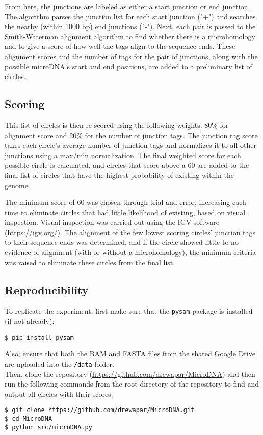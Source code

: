 \documentclass[11pt, letterpaper]{article}
\begin{document}
\noindent From here, the junctions are labeled as either a start junction or end junction. The algorithm parses the junction list for each start junction ("+") and searches the nearby (within 1000 bp) end junctions ("-"). Next, each pair is passed to the Smith-Waterman alignment algorithm to find whether there is a microhomology and to give a score of how well the tags align to the sequence ends. These alignment scores and the number of tags for the pair of junctions, along with the possible microDNA's start and end positions, are added to a preliminary list of circles.


\subsection{Scoring}
This list of circles is then re-scored using the following weights: 80\% for alignment score and 20\% for the number of junction tags. The junction tag score takes each circle's average number of junction tags and normalizes it to all other junctions using a max/min normalization. The final weighted score for each possible circle is calculated, and circles that score above a 60 are added to the final list of circles that have the highest probability of existing within the genome. 

\noindent The minimum score of 60 was chosen through trial and error, increasing each time to eliminate circles that had little likelihood of existing, based on visual inspection. Visual inspection was carried out using the IGV software (\url{https://igv.org/}). The alignment of the few lowest scoring circles' junction tags to their sequence ends was determined, and if the circle showed little to no evidence of alignment (with or without a microhomology), the minimum criteria was raised to eliminate these circles from the final list.


\subsection{Reproducibility}
To replicate the experiment, first make sure that the \texttt{pysam} package is installed (if not already):
\begin{verbatim}
$ pip install pysam
\end{verbatim}

\noindent Also, ensure that both the BAM and FASTA files from the shared Google Drive are uploaded into the \texttt{/data} folder.\\

\noindent Then, clone the repository (\url{https://github.com/drewapar/MicroDNA}) and then run the
following commands from the root directory of the repository to find and output all circles with their scores.
\begin{verbatim}
$ git clone https://github.com/drewapar/MicroDNA.git
$ cd MicroDNA
$ python src/microDNA.py
\end{verbatim}
\end{document}
